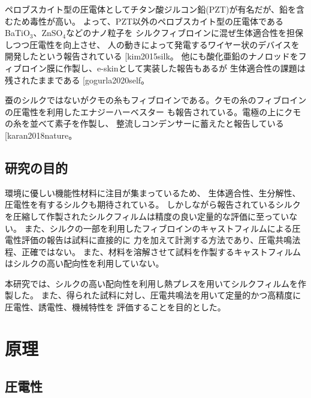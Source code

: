 \documentclass[dvipdfmx,12pt,a4paper]{jreport}
\makeatletter
\DeclareRobustCommand\cite{\unskip
    	\@ifnextchar[{\@tempswatrue\@citex}{\@tempswafalse\@citex[]}}
\makeatother
\begin{document}
			ペロブスカイト型の圧電体としてチタン酸ジルコン鉛(PZT)が有名だが、鉛を含むため毒性が高い。
			よって、PZT以外のペロブスカイト型の圧電体であるBaTiO$_3$、ZnSO$_4$などのナノ粒子を
			シルクフィブロインに混ぜ生体適合性を担保しつつ圧電性を向上させ、
			人の動きによって発電するワイヤー状のデバイスを開発したという報告されている\cite{kim2015silk}。
			他にも酸化亜鉛のナノロッドをフィブロイン膜に作製し、e-skinとして実装した報告もあるが
			生体適合性の課題は残されたままである\cite{gogurla2020self}。
			
			蚕のシルクではないがクモの糸もフィブロインである。クモの糸のフィブロインの圧電性を利用したエナジーハーベスター
			も報告されている。電極の上にクモの糸を並べて素子を作製し、
			整流しコンデンサーに蓄えたと報告している\cite{karan2018nature}。

		\section{研究の目的}
		環境に優しい機能性材料に注目が集まっているため、
		生体適合性、生分解性、圧電性を有するシルクも期待されている。
		しかしながら報告されているシルクを圧縮して作製されたシルクフィルムは精度の良い定量的な評価に至っていない。
		また、シルクの一部を利用したフィブロインのキャストフィルムによる圧電性評価の報告は試料に直接的に
		力を加えて計測する方法であり、圧電共鳴法程、正確ではない。
		また、材料を溶解させて試料を作製するキャストフィルムはシルクの高い配向性を利用していない。
		
		本研究では、シルクの高い配向性を利用し熱プレスを用いてシルクフィルムを作製した。
		また、得られた試料に対し、圧電共鳴法を用いて定量的かつ高精度に圧電性、誘電性、機械特性を
		評価することを目的とした。
	\chapter{原理}
		\section{圧電性}
\end{document}
